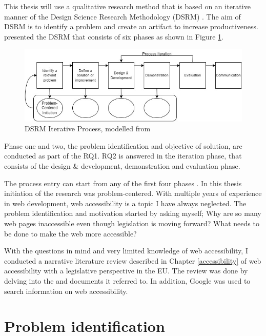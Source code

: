 This thesis will use a qualitative research method that is based on an iterative manner of the Design Science Research Methodology (DSRM) \citep{designsciencemethodology, iterativedesignscience}. The aim of DSRM is to identify a problem and create an artifact to increase productiveness. \textcite{iterativedesignscience} presented the DSRM that consists of six phases as shown in Figure \ref{fig:design-science}.

\begin{figure}
    \centering
    \includegraphics[width=1\linewidth]{image.png}
    \caption{DSRM Iterative Process, modelled from \textcite{iterativedesignscience}}
    \label{fig:design-science}
\end{figure}

Phase one and two, the problem identification and objective of solution, are conducted as part of the RQ1. RQ2 is answered in the iteration phase, that consists of the design \& development, demonstration and evaluation phase.

The process entry can start from any of the first four phases \citep{iterativedesignscience}. In this thesis initiation of the research was problem-centered. With multiple years of experience in web development, web accessibility is a topic I have always neglected. The problem identification and motivation started by asking myself; Why are so many web pages inaccessible even though legislation is moving forward? What needs to be done to make the web more accessible? 

With the questions in mind and very limited knowledge of web accessibility, I conducted a narrative literature review described in Chapter \ref{accessibility} of web accessibility with a legislative perspective in the EU. The review was done by delving into the \textcite{eudirective2016} and documents it referred to. In addition, Google was used to search information on web accessibility.

\section{Problem identification}

